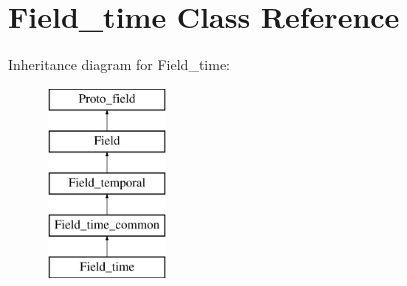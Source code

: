 \hypertarget{classField__time}{}\section{Field\+\_\+time Class Reference}
\label{classField__time}
Inheritance diagram for Field\+\_\+time\+:\begin{figure}[H]
\begin{center}
\leavevmode
\includegraphics[height=5.000000cm]{classField__time}
\end{center}
\end{figure}
